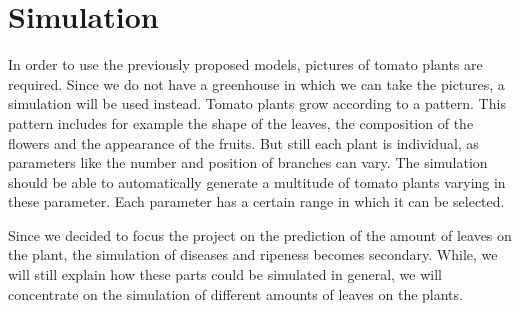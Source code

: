\section{Simulation}

In order to use the previously proposed models, pictures of tomato plants are required. Since we do not have a greenhouse in which we can take the pictures, a simulation will be used instead. Tomato plants grow according to a pattern. This pattern includes for example the shape of the leaves, the composition of the flowers and the appearance of the fruits. But still each plant is individual, as parameters like the number and position of branches can vary. The simulation should be able to automatically generate a multitude of tomato plants varying in these parameter. Each parameter has a certain range in which it can be selected.

Since we decided to focus the project on the prediction of the amount of leaves on the plant, the simulation of diseases and ripeness becomes secondary. While, we will still explain how these parts could be simulated in general, we will concentrate on the simulation of different amounts of leaves on the plants.  